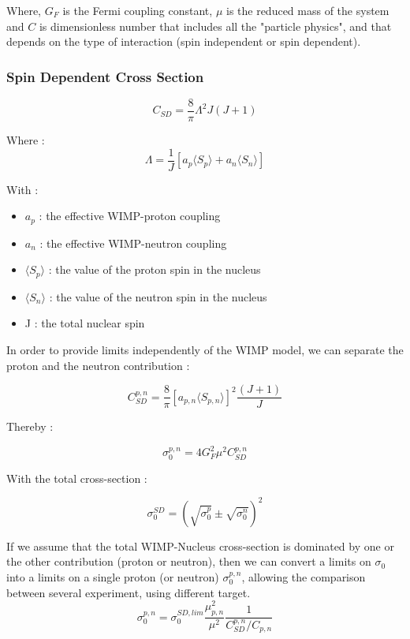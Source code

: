 \documentclass[a4paper, twoside, openany, 11pt]{book}
\begin{document}
Where, $G_F$ is the Fermi coupling constant, $\mu$ is the reduced mass of the system and $C$ is dimensionless number that includes all the "particle physics", and that depends on the type of interaction (spin independent or spin dependent).

\subsubsection*{Spin Dependent Cross Section}

 \begin{equation}
  C_{SD} = \frac{8}{\pi} \Lambda^2 J(J+1) 
 \end{equation}
 
 Where : 
 \begin{equation}
 \Lambda = \frac{1}{J} \left[ a_p \langle S_p \rangle +  a_n \langle S_n \rangle \right]
 \end{equation}
 
With : 
\begin{itemize}
\item $a_p$ : the effective WIMP-proton coupling 
\item $a_n$ : the effective WIMP-neutron coupling 
\item $\langle S_p \rangle$ : the value of the proton spin in the nucleus
\item $\langle S_n \rangle$ : the value of the neutron spin in the nucleus
\item J : the total nuclear spin
\end{itemize}

In order to provide limits independently of the WIMP model, we can separate the proton and the neutron contribution : 

\begin{equation}
C_{SD} ^{p,n} = \frac{8}{\pi}\left[ a_{p,n} \langle S_{p,n} \rangle \right]^2 \frac{(J+1)}{J} 
\end{equation}

Thereby : 

\begin{equation}
\sigma_0^{p,n} = 4 G_F^2 \mu^2 C_{SD} ^{p,n} 
\end{equation}

With the total cross-section : 

\begin{equation}
\sigma_0^{SD} = (\sqrt{\sigma_0^p} \pm \sqrt{\sigma_0^n} )^2
\end{equation}


If we assume that the total WIMP-Nucleus cross-section is dominated by one or the other contribution (proton or neutron), then we can convert a limits on $\sigma_0$ into a limits on a single proton (or neutron) $\sigma_0^{p,n}$, allowing the comparison between several experiment, using different target. 
\begin{equation}
\sigma_0^{p,n}= \sigma_0^{SD,lim} \frac{\mu_{p,n}^2}{\mu^2} \frac{1}{C_{SD}^{p,n}/C_{p,n}}
\end{equation}
\end{document}
